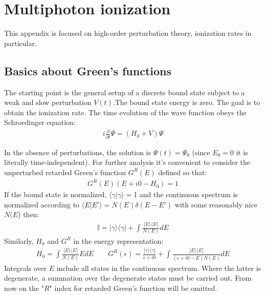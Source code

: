 \chapter{Multiphoton ionization} 
\label{app:multiphoton ionization}
This appendix is focused on high-order perturbation theory, ionization rates in particular. 

\section{Basics about Green's functions}

The starting point is the general setup of a discrete bound state subject to a weak and slow perturbation $ V(t) $.The bound state energy is zero. The goal is to obtain the ionization rate. The time evolution of the wave function obeys the Schroedinger equation:
\begin{gather}
\label{shr_eq_general}
	i\frac{\partial}{\partial t}\Psi=(H_{0}+V)\Psi
\end{gather}

In the absence of perturbations, the solution is $ \Psi(t)=\Psi_{0} $ (since $ E_{0}=0 $ it is literally time-independent). For further analysis it's convenient to consider the unperturbed retarded Green's function $ G^{R}(E) $ defined so that:
\begin{gather}
\label{green_function_def}
	G^{R}(E)(E+i0-H_{0})=1
\end{gather}
If the bound state is normalized, $ \langle\gamma|\gamma\rangle= $1 and the continuous spectrum is normalized according to $ \langle E|E'\rangle=N(E)\delta(E-E') $ with some reasonably nice $ N(E $) then:
\begin{gather}
\mathbb{I}=|\gamma\rangle\langle\gamma|+\int\frac{|E\rangle\langle E|}{N(E)}dE
\end{gather}
Similarly, $ H_{0} $ and $ G^{R} $ in the energy representation:
\begin{gather}
	H_{0}=\int\frac{|E\rangle\langle E|}{N(E)}EdE
	\qquad
	G^{R}(\epsilon)=\frac{|\gamma\rangle\langle\gamma|}{\epsilon+i0}+\int\frac{|E\rangle\langle E|}{(\epsilon+i0-E)N(E)}dE
\end{gather}
Integrals over $ E $ include all states in the continuous spectrum. Where the latter is degenerate, a summation over the degenerate states must be carried out. From now on the "$ R $" index for retarded Green's function will be omitted.

